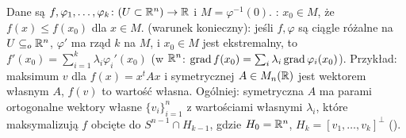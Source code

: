 Dane  są $f, \varphi_1, \ldots, \varphi_k \colon (U \subset \mathbb{R}^n) \to \mathbb{R}$ i $M = \varphi^{-1}(0)$.
: $x_0 \in M$, że $f(x) \le f(x_0)$ dla $x \in M$.
 (warunek konieczny): jeśli $f, \varphi$ są ciągle różalne na $U \subseteq_o \mathbb{R}^n$, $\varphi'$ ma rząd $k$ na $M$, i $x_0 \in M$ jest ekstremalny, to $f'(x_0) = \sum_{i=1}^k \lambda_i \varphi_i'(x_0)$ (w $\mathbb{R}^n$: $\operatorname{grad} f(x_0) = \sum_i \lambda_i \operatorname{grad} \varphi_i(x_0)$). 
Przykład: maksimum $v$ dla $f(x) = x^t A x$ i symetrycznej $A \in M_n(\mathbb{R})$ jest wektorem własnym $A$, $f(v)$ to wartość własna.
Ogólniej: symetryczna $A$ ma parami ortogonalne wektory własne $\{v_i\}_{i=1}^n$ z wartościami własnymi $\lambda_i$, które maksymalizują $f$ obcięte do $S^{n-1} \cap H_{k-1}$, gdzie $H_0 = \mathbb{R}^n$, $H_k = [v_1, \ldots, v_k]^\perp$ ().